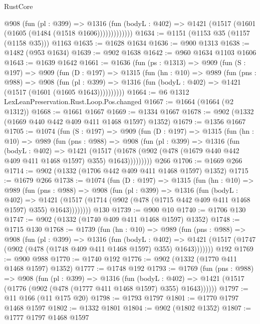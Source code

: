 \begin{lexlean}{RustCore}
\begin{coremodule}
              @908
                (fun (pl : @399) =>
                @1316
                  (fun (bodyL : @402) => @1421 (@1517 (@1601 (@1605 (@1484 (@1518 @1606)))))))))))))
@1634 := @1151 (@1153 @35 (@1157 (@1158 @35))) @1163
@1635 := @1628 @1634
@1636 := @900 @1313
@1638 := @1482 (@953 @1634)
@1639 := @902 @1638
@1642 := @960 @1634 @1103 @1606
@1643 := @1639 @1642
@1661 := @1636
    (fun (ps : @1313) =>
    @909
      (fun (S : @197) =>
      @909
        (fun (D : @197) =>
        @1315
          (fun (hn : @10) =>
          @989
            (fun (pns : @988) =>
            @908
              (fun (pl : @399) =>
              @1316 (fun (bodyL : @402) => @1421 (@1517 (@1601 (@1605 @1643))))))))))
@1664 := @6 @1312 LexLeanPreservation.Rust.Loop.Pos.changed
@1667 := @1664 (@1664 (@2 @1312))
@1668 := @1661 @1667
@1669 := @1334 @1667
@1678 := @902 (@1332 (@1669 @440 @442 @409 @411 @1468 @1597) @1352)
@1679 := @1356 @1667
@1705 := @1074
    (fun (S : @197) =>
    @909
      (fun (D : @197) =>
      @1315
        (fun (hn : @10) =>
        @989
          (fun (pns : @988) =>
          @908
            (fun (pl : @399) =>
            @1316
              (fun (bodyL : @402) =>
              @1421
                (@1517
                  (@1678 (@902 (@478 (@1679 @440 @442 @409 @411 @1468 @1597) @355) @1643)))))))))
    @266
@1706 := @1669 @266
@1714 := @902 (@1332 (@1706 @442 @409 @411 @1468 @1597) @1352)
@1715 := @1679 @266
@1738 := @1074
    (fun (D : @197) =>
    @1315
      (fun (hn : @10) =>
      @989
        (fun (pns : @988) =>
        @908
          (fun (pl : @399) =>
          @1316
            (fun (bodyL : @402) =>
            @1421 (@1517 (@1714 (@902 (@478 (@1715 @442 @409 @411 @1468 @1597) @355) @1643))))))))
    @130
@1739 := @900 @10
@1740 := @1706 @130
@1747 := @902 (@1332 (@1740 @409 @411 @1468 @1597) @1352)
@1748 := @1715 @130
@1768 := @1739
    (fun (hn : @10) =>
    @989
      (fun (pns : @988) =>
      @908
        (fun (pl : @399) =>
        @1316
          (fun (bodyL : @402) =>
          @1421 (@1517 (@1747 (@902 (@478 (@1748 @409 @411 @1468 @1597) @355) @1643)))))))
    @192
@1769 := @900 @988
@1770 := @1740 @192
@1776 := @902 (@1332 (@1770 @411 @1468 @1597) @1352)
@1777 := @1748 @192
@1793 := @1769
    (fun (pns : @988) =>
    @908
      (fun (pl : @399) =>
      @1316
        (fun (bodyL : @402) =>
        @1421 (@1517 (@1776 (@902 (@478 (@1777 @411 @1468 @1597) @355) @1643))))))
@1797 := @11 @166 (@11 @175 @20)
@1798 := @1793 @1797
@1801 := @1770 @1797 @1468 @1597
@1802 := @1332 @1801
@1804 := @902 (@1802 @1352)
@1807 := @1777 @1797 @1468 @1597

\end{coremodule}
\end{lexlean}
